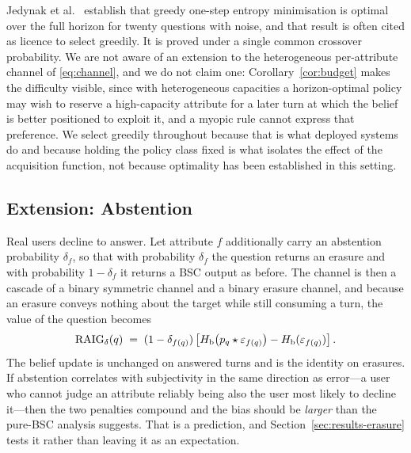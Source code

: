 \begin{remark}
\label{rem:greedy}
Jedynak et al.~\cite{jedynak2012} establish that greedy one-step entropy
minimisation is optimal over the full horizon for twenty questions with noise,
and that result is often cited as licence to select greedily. It is proved
under a single common crossover probability. We are not aware of an extension
to the heterogeneous per-attribute channel of \eqref{eq:channel}, and we do not
claim one: Corollary~\ref{cor:budget} makes the difficulty visible, since with
heterogeneous capacities a horizon-optimal policy may wish to reserve a
high-capacity attribute for a later turn at which the belief is better
positioned to exploit it, and a myopic rule cannot express that preference. We
select greedily throughout because that is what deployed systems do and because
holding the policy class fixed is what isolates the effect of the acquisition
function, not because optimality has been established in this setting.
\end{remark}

\subsection{Extension: Abstention}
\label{sec:erasure}

Real users decline to answer. Let attribute $f$ additionally carry an
abstention probability $\delta_f$, so that with probability $\delta_f$ the
question returns an erasure and with probability $1-\delta_f$ it returns a
BSC output as before. The channel is then a cascade of a binary symmetric
channel and a binary erasure channel, and because an erasure conveys nothing
about the target while still consuming a turn, the value of the question
becomes
\begin{equation}
\mathrm{RAIG}_\delta(q) \;=\; (1-\delta_{f(q)})
\left[H_{\mathrm{b}}\!\left(p_q \star \varepsilon_{f(q)}\right) - H_{\mathrm{b}}(\varepsilon_{f(q)})\right].
\label{eq:erasure}
\end{equation}
The belief update is unchanged on answered turns and is the identity on
erasures. If abstention correlates with subjectivity in the same direction as
error---a user who cannot judge an attribute reliably being also the user most
likely to decline it---then the two penalties compound and the bias should be
\emph{larger} than the pure-BSC analysis suggests. That is a prediction, and
Section~\ref{sec:results-erasure} tests it rather than leaving it as an
expectation.
